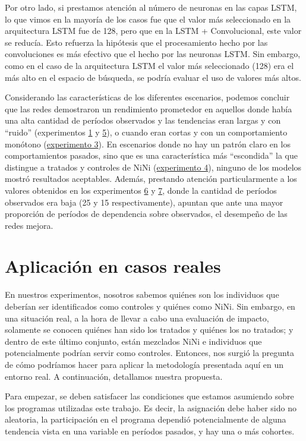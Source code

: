 \documentclass[../main.tex]{subfiles}
\begin{document}
Por otro lado, si prestamos atención al número de neuronas en las capas LSTM, lo que vimos
en la mayoría de los casos fue que el valor más seleccionado en la arquitectura LSTM fue
de 128, pero que en la LSTM + Convolucional, este valor se reducía. Esto refuerza la
hipótesis que el procesamiento hecho por las convoluciones es más efectivo que el hecho
por las neuronas LSTM. Sin embargo, como en el caso de la arquitectura LSTM el valor más
seleccionado (128) era el más alto en el espacio de búsqueda, se podría evaluar el uso de
valores más altos.

Considerando las características de los diferentes escenarios, podemos concluir que las
redes demostraron un rendimiento prometedor en aquellos donde había una alta cantidad de
períodos observados y las tendencias eran largas y con ``ruido'' (experimentos
\hyperref[sec:exp1]{1} y \hyperref[sec:exp5]{5}), o cuando eran cortas y con un
comportamiento monótono (\hyperref[sec:exp3]{experimento 3}). En escenarios donde no hay
un patrón claro en los comportamientos pasados, sino que es una característica más
``escondida'' la que distingue a tratados y controles de NiNi
(\hyperref[sec:exp4]{experimento 4}), ninguno de los modelos mostró resultados aceptables.
Además, prestando atención particularmente a los valores obtenidos en los experimentos
\hyperref[sec:exp6]{6} y \hyperref[sec:exp7]{7}, donde la cantidad de períodos observados
era baja (25 y 15 respectivamente), apuntan que ante una mayor proporción de períodos de
dependencia sobre observados, el desempeño de las redes mejora.

\section{Aplicación en casos reales}
En nuestros experimentos, nosotros sabemos quiénes son los individuos que deberían ser
identificados como controles y quiénes como NiNi. Sin embargo, en una situación real, a la
hora de llevar a cabo una evaluación de impacto, solamente se conocen quiénes han sido los
tratados y quiénes los no tratados; y dentro de este último conjunto, están mezclados NiNi
e individuos que potencialmente podrían servir como controles. Entonces, nos surgió la
pregunta de cómo podríamos hacer para aplicar la metodología presentada aquí en un entorno
real. A continuación, detallamos nuestra propuesta.

Para empezar, se deben satisfacer las condiciones que estamos asumiendo sobre los
programas utilizadas este trabajo. Es decir, la asignación debe haber sido no aleatoria,
la participación en el programa dependió potencialmente de alguna tendencia vista en una
variable en períodos pasados, y hay una o más cohortes.
\end{document}
